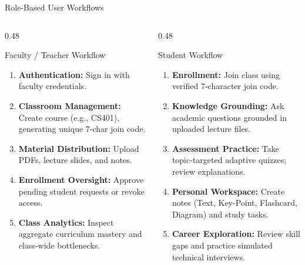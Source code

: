 \documentclass[aspectratio=169,10pt]{beamer}
\begin{document}
\begin{frame}{Role-Based User Workflows}
  \begin{columns}[T]
    \begin{column}{0.48\textwidth}
      \begin{block}{Faculty / Teacher Workflow}
        \begin{enumerate}
          \item \textbf{Authentication:} Sign in with faculty credentials.
          \item \textbf{Classroom Management:} Create course (e.g., CS401), generating unique 7-char join code.
          \item \textbf{Material Distribution:} Upload PDFs, lecture slides, and notes.
          \item \textbf{Enrollment Oversight:} Approve pending student requests or revoke access.
          \item \textbf{Class Analytics:} Inspect aggregate curriculum mastery and class-wide bottlenecks.
        \end{enumerate}
      \end{block}
    \end{column}
    \begin{column}{0.48\textwidth}
      \begin{block}{Student Workflow}
        \begin{enumerate}
          \item \textbf{Enrollment:} Join class using verified 7-character join code.
          \item \textbf{Knowledge Grounding:} Ask academic questions grounded in uploaded lecture files.
          \item \textbf{Assessment Practice:} Take topic-targeted adaptive quizzes; review explanations.
          \item \textbf{Personal Workspace:} Create notes (Text, Key-Point, Flashcard, Diagram) and study tasks.
          \item \textbf{Career Exploration:} Review skill gaps and practice simulated technical interviews.
        \end{enumerate}
      \end{block}
    \end{column}
  \end{columns}
\end{frame}
\end{document}
